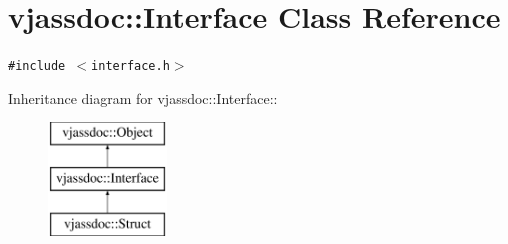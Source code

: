\hypertarget{classvjassdoc_1_1Interface}{
\section{vjassdoc::Interface Class Reference}
\label{classvjassdoc_1_1Interface}
}
{\tt \#include $<$interface.h$>$}

Inheritance diagram for vjassdoc::Interface::\begin{figure}[H]
\begin{center}
\leavevmode
\includegraphics[height=3cm]{classvjassdoc_1_1Interface}
\end{center}
\end{figure}
